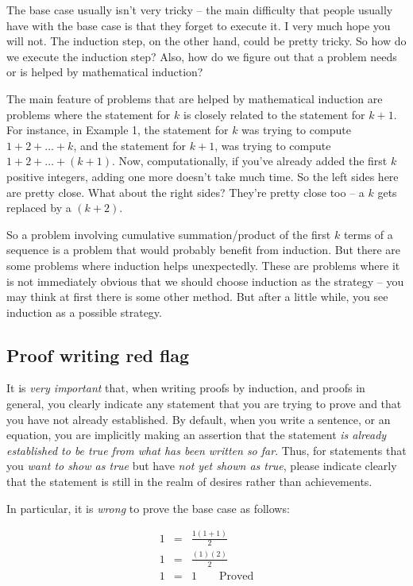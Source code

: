 \documentclass{amsart}
\begin{document}
The base case usually isn't very tricky -- the main difficulty that
people usually have with the base case is that they forget to execute
it. I very much hope you will not. The induction step, on the other
hand, could be pretty tricky. So how do we execute the induction step?
Also, how do we figure out that a problem needs or is helped by
mathematical induction?

The main feature of problems that are helped by mathematical induction
are problems where the statement for $k$ is closely related to the
statement for $k + 1$. For instance, in Example 1, the statement for
$k$ was trying to compute $1 + 2 + \dots + k$, and the statement for
$k + 1$, was trying to compute $1 + 2 + \dots + (k + 1)$. Now,
computationally, if you've already added the first $k$ positive
integers, adding one more doesn't take much time. So the left sides
here are pretty close. What about the right sides? They're pretty
close too -- a $k$ gets replaced by a $(k + 2)$.

So a problem involving cumulative summation/product of the first $k$
terms of a sequence is a problem that would probably benefit from
induction. But there are some problems where induction helps
unexpectedly. These are problems where it is not immediately obvious
that we should choose induction as the strategy -- you may think at
first there is some other method. But after a little while, you see
induction as a possible strategy.

\subsection{Proof writing red flag}

It is {\em very important} that, when writing proofs by induction, and
proofs in general, you clearly indicate any statement that you are
trying to prove and that you have not already established. By default,
when you write a sentence, or an equation, you are implicitly making
an assertion that the statement {\em is already established to be true
from what has been written so far}. Thus, for statements that you {\em
want to show as true} but have {\em not yet shown as true}, please
indicate clearly that the statement is still in the realm of desires
rather than achievements.

In particular, it is {\em wrong} to prove the base case as follows:

\begin{eqnarray*}
  1 & = & \frac{1(1 + 1)}{2}\\
  1 & = & \frac{(1)(2)}{2}\\
  1 & = & 1 \qquad \text{Proved}
\end{eqnarray*}
\end{document}
